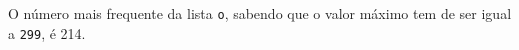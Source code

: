 \documentclass[12pt,varwidth=16cm,border=1pt]{standalone}
\begin{document}
O número mais frequente da lista \verb+o+, sabendo que o valor máximo tem de ser igual a \verb+299+, é 214.

\questiomtrue
\end{document}
